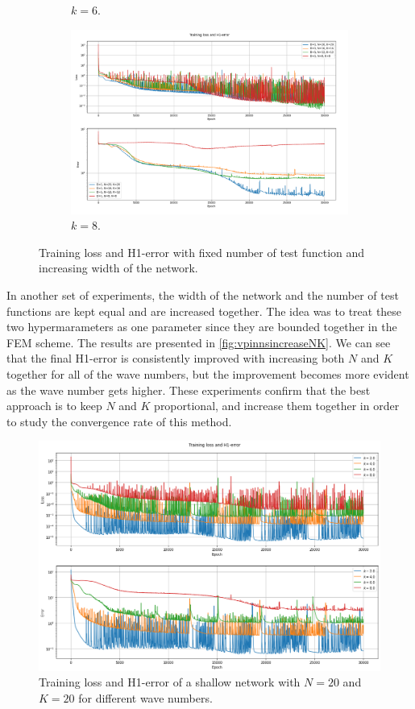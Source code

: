 \begin{figure}[h!]
\begin{subfigure}[b]{0.48\textwidth}
        \caption{$k=6$.}
        \label{fig:vpinnsk6increaseNK}
    \end{subfigure}
    \hfill
    \begin{subfigure}[b]{0.48\textwidth}
        \includegraphics[width=\textwidth]{img/VPINN-Comparison-k8increaseNK.png}
        \caption{$k=8$.}
        \label{fig:vpinnsk8increaseNK}
    \end{subfigure}
    \caption{Training loss and H1-error with fixed number of test function and increasing width of the network.}
    \label{fig:vpinnsincreaseNK}
\end{figure}

In another set of experiments, the width of the network and the number of test functions are kept equal and are increased together. The idea was to treat these two hypermarameters as one parameter since they are bounded together in the FEM scheme. The results are presented in \autoref{fig:vpinnsincreaseNK}. We can see that the final H1-error is consistently improved with increasing both $N$ and $K$ together for all of the wave numbers, but the improvement becomes more evident as the wave number gets higher. These experiments confirm that the best approach is to keep $N$ and $K$ proportional, and increase them together in order to study the convergence rate of this method.

\begin{figure}[h!]
    \centering
    \includegraphics[width=.48\textwidth]{img/VPINN-Comparison-NK20increasek.png}
    \caption{Training loss and H1-error of a shallow network with $N=20$ and $K=20$ for different wave numbers.}
    \label{fig:vpinnsincreasefreq}
\end{figure}

